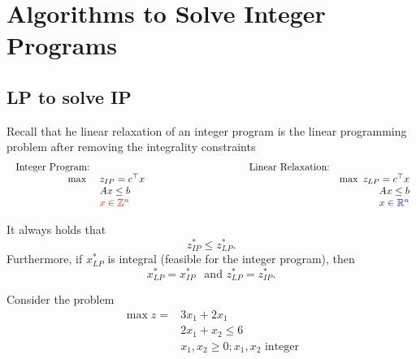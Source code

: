 \documentclass[../open-optimization/open-optimization.tex]{subfiles}
\begin{document}
\chapter{Algorithms to Solve Integer Programs}
\label{sec:IP-algorithms}
\section{LP to solve IP}

Recall that he linear relaxation of an integer program is the linear programming problem after removing the integrality constraints
$$
\begin{array}{rlclr}
\text{ Integer Program:} & & & \text{Linear Relaxation:}\\
\max \ & z_{IP} = c^\top x & \hspace{3cm} & & \max \  z_{LP} = c^\top x \\
& Ax \leq b & & & Ax \leq b\\
& \tred{x \in \Z^n} & & & \tblue{x \in \R^n}
\end{array}
$$

\begin{theorem}
It always holds that 
\begin{equation}
z^*_{IP} \leq z^*_{LP}.
\end{equation}
Furthermore, if $x^*_{LP}$ is integral (feasible for the integer program), then 
\begin{equation}
x^*_{LP} = x^*_{IP} \ \ \text{ and } z^*_{LP} = z^*_{IP}.
\end{equation}
\end{theorem}

\begin{example}

%
\begin{minipage}[t]{0.5\textwidth}
Consider the problem 
\begin{align*}
\max z = & 3x_1 + 2x_1\\
& 2x_1 + x_2 \leq 6\\
& x_1, x_2 \geq 0; x_1, x_2 \text{ integer}
\end{align*}
\end{minipage}
%
\begin{minipage}[t]{0.4\textwidth}
\end{minipage}
\end{example}
\end{document}
